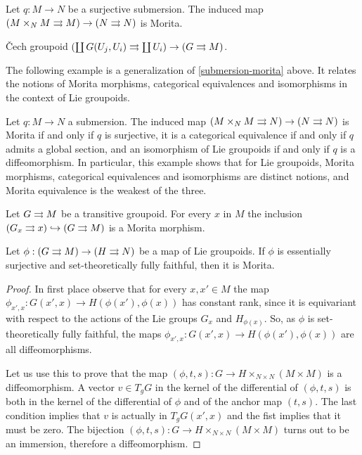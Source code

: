 \begin{example}\label{submersion-morita}
Let $q\colon M\to N$ be a surjective submersion.
The induced map $(M\times_N M \rightrightarrows M)\to(N\rightrightarrows N)$ is Morita. 
\end{example}

\begin{example}
\v{C}ech groupoid 
$\left( \coprod G(U_j,U_i) \rightrightarrows \coprod U_i \right) \to \left( G\rightrightarrows M \right)$.
\end{example}

The following example is a generalization of \ref{submersion-morita} above.
It relates the notions of Morita morphisms, categorical equivalences and isomorphisms in the context of Lie groupoids.

\begin{example}
Let $q\colon M\to N$ a submersion.
The induced map $(M\times_N M\rightrightarrows N)\to (N\rightrightarrows N)$ is Morita if and only if $q$ is surjective, it is a categorical equivalence if and only if $q$ admits a global section, and an isomorphism of Lie groupoids if and only if $q$ is a diffeomorphism.
In particular, this example shows that for Lie groupoids, Morita morphisms, categorical equivalences and isomorphisms are distinct notions, and Morita equivalence is the weakest of the three.
\end{example}

\begin{example}
Let $G\rightrightarrows M$ be a transitive groupoid.
For every $x$ in $M$ the inclusion
$(G_x\rightrightarrows x) \hookrightarrow (G\rightrightarrows M)$
is a Morita morphism.
\end{example}

\begin{lemma}\label{ES-and-stFF}
Let $\phi: (G\rightrightarrows M) \to (H\rightrightarrows N)$ be a map of Lie groupoids.
If $\phi$ is essentially surjective and set-theoretically fully faithful, then it is Morita.
\end{lemma}

\begin{proof}
In first place observe that for every $x,x'\in M$ the map $\phi_{x',x}: G(x',x)\to H(\phi(x'),\phi(x))$ has constant rank, since it is equivariant with respect to the actions of the Lie groups $G_x$ and $H_{\phi(x)}$.
So, as $\phi$ is set-theoretically fully faithful, the maps $\phi_{x',x}: G(x',x)\to H(\phi(x'),\phi(x))$ are all diffeomorphisms.

Let us use this to prove that the map $(\phi,t,s): G\to H\times_{N\times N} (M\times M)$ is a diffeomorphism.
A vector $v\in T_gG$ in the kernel of the differential of $(\phi,t,s)$ is both in the kernel of the differential of $\phi$ and of the anchor map $(t,s)$.
The last condition implies that $v$ is actually in $T_gG(x',x)$ and the fist implies that it must be zero.
The bijection $(\phi,t,s): G\to H\times_{N\times N} (M\times M)$ turns out to be an immersion, therefore a diffeomorphism.
\end{proof}


